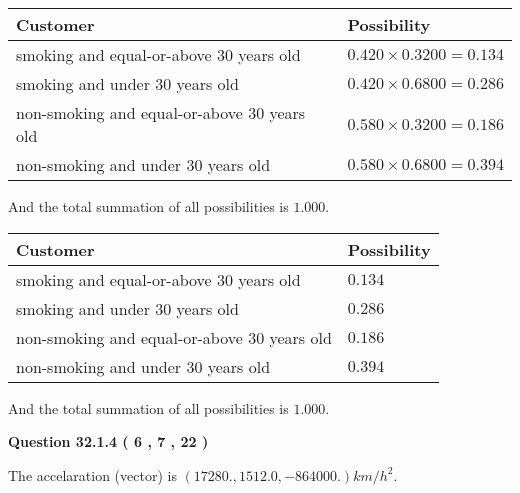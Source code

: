 \documentclass[12pt]{article}
\begin{document}
\noindent
\begin{tabular}{|l|l|}
\hline
Customer & Possibility \\
\hline
smoking  and  %
equal-or-above 30 years old  &
  $ %
0.420 \times  %
0.3200 =  %
0.134$ \\
\hline
smoking  and  %
under 30 years old &
  $ %
0.420 \times  %
0.6800 =  %
0.286$ \\
\hline
 non-smoking and  %
equal-or-above 30 years old  &
  $ %
0.580 \times  %
0.3200 =  %
0.186$ \\
\hline
 non-smoking and  %
under 30 years old &
  $ %
0.580 \times  %
0.6800 =  %
0.394$ \\
\hline
\end{tabular}
 
\noindent
And the total summation of all possibilities is $  %
1.000 $.
 
 
 
 
 
 
\noindent{}

 
\noindent
\begin{tabular}{|l|l|}
\hline
Customer & Possibility \\
\hline
smoking  and  %
equal-or-above 30 years old &
  $ %
0.134$ \\
\hline
smoking  and  %
under 30 years old &
  $ %
0.286$ \\
\hline
 non-smoking and  %
equal-or-above 30 years old &
  $ %
0.186$ \\
\hline
 non-smoking and  %
under 30 years old &
  $ %
0.394$ \\
\hline
\end{tabular}
 
\noindent
 And the total summation of all possibilities is $  %
1.000 $.
 
 
 
  
\vspace{0.2in}
  
{\textbf{\Large{Question
32.1.4 
 (           6 ,           7 ,          22 )
}}}
  
  
 
 
\noindent{}
 
 
The accelaration (vector) is
$(
17280.,
1512.0 ,
-864000.
)km/h^2.
$
 
 
 
 
 
\end{document}
